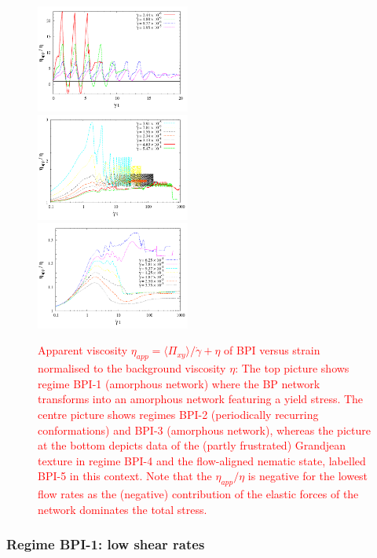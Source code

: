 \documentclass[8.5pt,twoside,twocolumn]{article}
\newcommand{\rev}[1]{{\textcolor{red}{#1}}}
\begin{document}
\begin{figure}[htpb]
\includegraphics[width=0.45\textwidth]{app_visc_strain_bp1_a.pdf}\\
\includegraphics[width=0.45\textwidth]{app_visc_strain_bp1_b.pdf}\\
\includegraphics[width=0.45\textwidth]{app_visc_strain_bp1_c.pdf}
\caption{
\rev{
Apparent viscosity $\eta_{app}=\langle \Pi_{xy}\rangle/\dot{\gamma} + \eta$ of BPI versus strain normalised to the background viscosity $\eta$: 
The top picture shows regime BPI-1 (amorphous network) where
the BP network transforms into an amorphous network featuring a yield stress.
The centre picture shows regimes BPI-2 (periodically recurring conformations) and BPI-3 (amorphous network), 
whereas the picture at the bottom
depicts data of the (partly frustrated) Grandjean texture in regime BPI-4 
and the flow-aligned nematic state, labelled BPI-5 in this context. 
Note that the $\eta_{app}/\eta$ is negative for the lowest 
flow rates as the (negative) contribution of the elastic forces
of the network dominates the total stress.
}
}
\label{bp1-appvisc}
\end{figure}


\subsubsection{Regime BPI-1: low shear rates }
\end{document}
